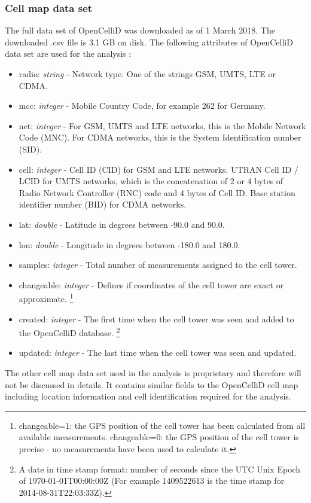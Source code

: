 \subsubsection{Cell map data set}
The full data set of OpenCelliD was downloaded as of 1 March 2018. The downloaded .csv file is 3.1 GB on disk. The following attributes of OpenCelliD data set are used for the analysis \cite{opencellid}:
\begin{itemize}
\item radio: \textit{string} - Network type. One of the strings GSM, UMTS, LTE or CDMA.
\item mcc:  \textit{integer}  -  Mobile Country Code, for example 262 for Germany.
\item net: \textit{integer} - For GSM, UMTS and LTE networks, this is the Mobile Network Code (MNC). For CDMA networks, this is the System Identification number (SID).
\item cell: \textit{integer} - Cell ID (CID) for GSM and LTE networks. UTRAN Cell ID / LCID for UMTS networks, which is the concatenation of 2 or 4 bytes of Radio Network Controller (RNC) code and 4 bytes of Cell ID. Base station identifier number (BID) for CDMA networks.
\item lat: \textit{double} - Latitude in degrees between -90.0 and 90.0.
\item lon: \textit{double} - Longitude in degrees between -180.0 and 180.0.
\item samples: \textit{integer} - Total number of measurements assigned to the cell tower.
\item changeable:  \textit{integer} - Defines if coordinates of the cell tower are exact or approximate. \footnote{changeable=1: the GPS position of the cell tower has been calculated from all available measurements. changeable=0: the GPS position of the cell tower is precise - no measurements have been used to calculate it.}
\item created: \textit{integer} - The first time when the cell tower was seen and added to the OpenCelliD database. \footnote{A date in time stamp format: number of seconds since the UTC Unix Epoch of 1970-01-01T00:00:00Z (For example 1409522613 is the time stamp for 2014-08-31T22:03:33Z).}
\item updated: \textit{integer} - The last time when the cell tower was seen and updated.
\end{itemize}

The other cell map data set used in the analysis is proprietary and therefore will not be discussed in details. It contains similar fields to the OpenCelliD cell map including location information and cell identification required for the analysis.

